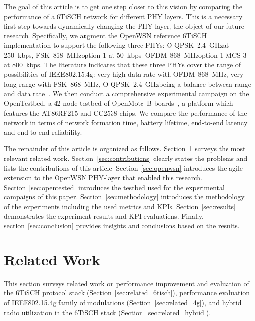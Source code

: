 \documentclass[sensors,article,submit,moreauthors,pdftex]{Definitions/mdpi}
\newcommand{\fsk}           {FSK~868~MHz}
\newcommand{\oqpsk}         {O-QPSK~2.4~GHz}
\newcommand{\ofdm}          {OFDM~868~MHz}
\begin{document}

The goal of this article is to get one step closer to this vision by comparing the performance of a 6TiSCH network for different PHY layers.
This is a necessary first step towards dynamically changing the PHY layer,
    the object of our future research.
Specifically, we augment the OpenWSN reference 6TiSCH implementation to support the following three PHYs:
    \oqpsk at 250~kbps,
    \fsk option 1 at 50~kbps,
    \ofdm option 1 MCS 3 at 800~kbps.
The literature indicates that these three PHYs cover the range of possibilities of IEEE802.15.4g:
    very high data rate with \ofdm,
    very long range with \fsk,
    \oqpsk being a balance between range and data rate~\cite{munoz19km,draft-munoz-6tisch-multi-phy-nodes,brachmann19ieee}.
We then conduct a comprehensive experimental campaign on the OpenTestbed, a 42-node testbed of OpenMote~B boards~\cite{tuset16openmote}, a platform which features the AT86RF215 and CC2538 chips.
We compare the performance of the network in terms of
    network formation time,
    battery lifetime,
    end-to-end latency and
    end-to-end reliability.


The remainder of this article is organized as follows.
Section~\ref{sec:related} surveys the most relevant related work.
Section~\ref{sec:contributions} clearly states the problems and lists the contributions of this article.
Section~\ref{sec:openwsn} introduces the agile extension to the OpenWSN PHY-layer that enabled this research.
Section~\ref{sec:opentested} introduces the testbed used for the experimental campaigns of this paper.
Section~\ref{sec:methodology} introduces the methodology of the experiments including the used metrics and KPIs.
Section~\ref{sec:results} demonstrates the experiment results and KPI evaluations.
Finally, section~\ref{sec:conclusion} provides insights and conclusions based on the results.

\section{Related Work}
\label{sec:related}


This section surveys related work on
    performance improvement and evaluation of the 6TiSCH protocol stack (Section~\ref{sec:related_6tisch}),
    performance evaluation of IEEE802.15.4g family of modulations (Section~\ref{sec:related_4g}), and
    hybrid radio utilization in the 6TiSCH stack  (Section~\ref{sec:related_hybrid}). 
\end{document}
